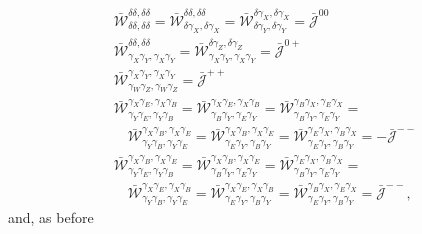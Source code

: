 \documentclass[a4paper,11pt]{article}
\begin{document}
        \begin{align}
          &\bar{\mathcal{W}}^{\delta  \delta  ,\delta  \delta  }_{\delta  \delta  ,\delta  \delta  }=
           \bar{\mathcal{W}}^{\delta  \delta  ,\delta  \delta  }_{\delta  \gamma_X,\delta  \gamma_X}=
           \bar{\mathcal{W}}^{\delta  \gamma_X,\delta  \gamma_X}_{\delta  \gamma_Y,\delta  \gamma_Y}=\bar{\mathcal{J}}^{00}\\
          &\bar{\mathcal{W}}^{\delta  \delta  ,\delta  \delta  }_{\gamma_X\gamma_Y,\gamma_X\gamma_Y}=
           \bar{\mathcal{W}}^{\delta  \gamma_Z,\delta  \gamma_Z}_{\gamma_X\gamma_Y,\gamma_X\gamma_Y}=\bar{\mathcal{J}}^{0+}\\
          &\bar{\mathcal{W}}^{\gamma_X\gamma_Y,\gamma_X\gamma_Y}_{\gamma_W\gamma_Z,\gamma_W\gamma_Z}=\bar{\mathcal{J}}^{++}\\\nonumber
          &\bar{\mathcal{W}}^{\gamma_X\gamma_E,\gamma_X\gamma_B}_{\gamma_Y\gamma_E,\gamma_Y\gamma_B}=
           \bar{\mathcal{W}}^{\gamma_X\gamma_E,\gamma_X\gamma_B}_{\gamma_B\gamma_Y,\gamma_E\gamma_Y}=
           \bar{\mathcal{W}}^{\gamma_B\gamma_X,\gamma_E\gamma_X}_{\gamma_B\gamma_Y,\gamma_E\gamma_Y}=\\
          &\hspace{12pt}
           \bar{\mathcal{W}}^{\gamma_X\gamma_B,\gamma_X\gamma_E}_{\gamma_Y\gamma_B,\gamma_Y\gamma_E}=
           \bar{\mathcal{W}}^{\gamma_X\gamma_B,\gamma_X\gamma_E}_{\gamma_E\gamma_Y,\gamma_B\gamma_Y}=
           \bar{\mathcal{W}}^{\gamma_E\gamma_X,\gamma_B\gamma_X}_{\gamma_E\gamma_Y,\gamma_B\gamma_Y}=-\bar{\mathcal{J}}^{--}\\\nonumber
          &\bar{\mathcal{W}}^{\gamma_X\gamma_B,\gamma_X\gamma_E}_{\gamma_Y\gamma_E,\gamma_Y\gamma_B}=
           \bar{\mathcal{W}}^{\gamma_X\gamma_B,\gamma_X\gamma_E}_{\gamma_B\gamma_Y,\gamma_E\gamma_Y}=
           \bar{\mathcal{W}}^{\gamma_E\gamma_X,\gamma_B\gamma_X}_{\gamma_B\gamma_Y,\gamma_E\gamma_Y}=\\
          &\hspace{12pt}
           \bar{\mathcal{W}}^{\gamma_X\gamma_E,\gamma_X\gamma_B}_{\gamma_Y\gamma_B,\gamma_Y\gamma_E}=
           \bar{\mathcal{W}}^{\gamma_X\gamma_E,\gamma_X\gamma_B}_{\gamma_E\gamma_Y,\gamma_B\gamma_Y}=
           \bar{\mathcal{W}}^{\gamma_B\gamma_X,\gamma_E\gamma_X}_{\gamma_E\gamma_Y,\gamma_B\gamma_Y}=\bar{\mathcal{J}}^{--},
        \end{align}
        and, as before
\end{document}
